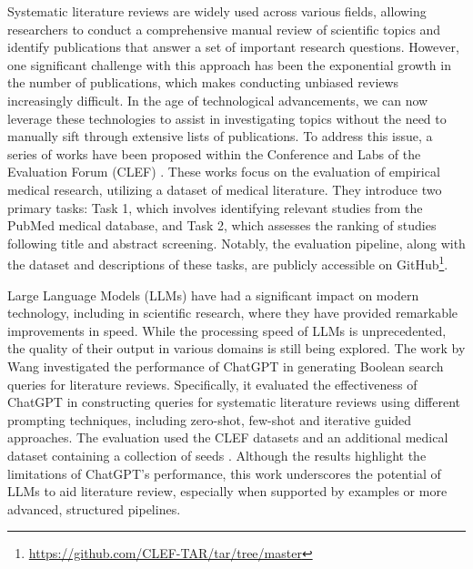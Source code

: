 Systematic literature reviews are widely used across various fields, allowing researchers to conduct a comprehensive manual review of scientific topics and identify publications that answer a set of important research questions. However, one significant challenge with this approach has been the exponential growth in the number of publications, which makes conducting unbiased reviews increasingly difficult. In the age of technological advancements, we can now leverage these technologies to assist in investigating topics without the need to manually sift through extensive lists of publications. To address this issue, a series of works have been proposed within the Conference and Labs of the Evaluation Forum (CLEF) \autocite{kanoulas2017clef, kanoulas2018clef, kanoulas2019clef}. These works focus on the evaluation of empirical medical research, utilizing a dataset of medical literature. They introduce two primary tasks: Task 1, which involves identifying relevant studies from the PubMed medical database, and Task 2, which assesses the ranking of studies following title and abstract screening. Notably, the evaluation pipeline, along with the dataset and descriptions of these tasks, are publicly accessible on GitHub\footnote{\url{https://github.com/CLEF-TAR/tar/tree/master}}.

Large Language Models (LLMs) have had a significant impact on modern technology, including in scientific research, where they have provided remarkable improvements in speed. While the processing speed of LLMs is unprecedented, the quality of their output in various domains is still being explored. The work by Wang \autocite{wang2023can} investigated the performance of ChatGPT in generating Boolean search queries for literature reviews. Specifically, it evaluated the effectiveness of ChatGPT in constructing queries for systematic literature reviews using different prompting techniques, including zero-shot, few-shot and iterative guided approaches. The evaluation used the CLEF datasets \autocite{kanoulas2017clef, kanoulas2018clef, kanoulas2019clef} and an additional medical dataset containing a collection of seeds \autocite{Wang_2022}. Although the results highlight the limitations of ChatGPT's performance, this work underscores the potential of LLMs to aid literature review, especially when supported by examples or more advanced, structured pipelines.


